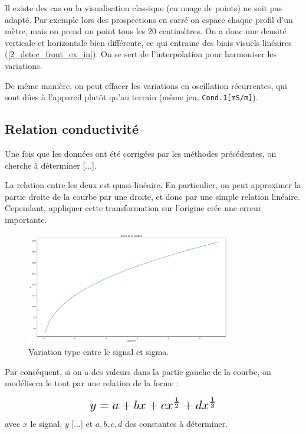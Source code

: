 \documentclass[12pt]{article}
\begin{document}
    Il existe des cas ou la visualisation classique (en nuage de points) ne soit pas adapté. Par exemple lors des prospections en carré on espace chaque profil d'un mètre, mais on prend un point tous les 20 centimètres. On a donc une densité verticale et horizontale bien différente, ce qui entraine des biais visuels linéaires (\ref{2_detec_front_ex_in}). On se sert de l'interpolation pour harmoniser les variations.

    De même manière, on peut effacer les variations en oscillation récurrentes, qui sont dûes à l'appareil plutôt qu'au terrain (même jeu, \texttt{Cond.1[mS/m]}).

\newpage
\subsection{Relation conductivité}

    Une fois que les données ont été corrigées par les méthodes précédentes, on cherche à déterminer [...].

    La relation entre les deux est quasi-linéaire. En particulier, on peut approximer la partie droite de la courbe par une droite, et donc par une simple relation linéaire. Cependant, appliquer cette transformation sur l'origine crée une erreur importante.
    \begin{figure}[ht!]
        \centering
        \includegraphics[width=0.8\textwidth]{Images/Relation_Allure.png}  
        \caption{Variation type entre le signal et sigma.}
    \end{figure}

    Par conséquent, si on a des valeurs dans la partie gauche de la courbe, on modélisera le tout par une relation de la forme :

    \begin{equation}
        \scalebox{1.5}{$y = a + bx + cx^{\frac{1}{2}} + dx^{\frac{1}{3}}$}
    \end{equation}
    avec $x$ le signal, $y$ [...] et $a,b,c,d$ des constantes à déterminer.
\end{document}
